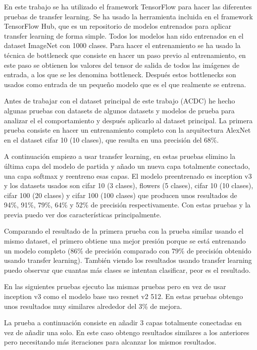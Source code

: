 \documentclass[12pt,a4paper]{article}
\begin{document}
En este trabajo se ha utilizado el framework TensorFlow para hacer las diferentes pruebas de transfer learning. Se ha usado la herramienta incluida en el framework TensorFlow Hub, que es un repositorio de modelos entrenados para aplicar transfer learning de forma simple. Todos los modelos han sido entrenados en el dataset ImageNet con 1000 clases. Para hacer el entrenamiento se ha usado la técnica de bottleneck que consiste en hacer un paso previo al entrenamiento, en este paso se obtienen los valores del tensor de salida de todos las imágenes de entrada, a los que se les denomina bottleneck. Después estos bottlenecks son usados como entrada de un pequeño modelo que es el que realmente se entrena.
\bigskip

Antes de trabajar con el dataset principal de este trabajo (ACDC) he hecho algunas pruebas con datasets de algunos datasets y modelos de prueba para analizar el el comportamiento y después aplicarlo al dataset principal. La primera prueba consiste en hacer un entrenamiento completo con la arquitectura AlexNet en el dataset cifar 10 (10 clases), que resulta en una precisión del 68\%.
\bigskip

A continuación empiezo a usar transfer learning, en estas pruebas elimino la última capa del modelo de partida y añado un nueva capa totalmente conectado, una capa softmax y reentreno esas capas. El modelo preentrenado es inception v3 y los datasets usados son cifar 10 (3 clases), flowers (5 clases), cifar 10 (10 clases), cifar 100 (20 clases) y cifar 100 (100 clases) que producen unos resultados de 94\%, 91\%, 79\%, 64\% y 52\% de precisión respectivamente. Con estas pruebas y la previa puedo ver dos características principalmente.
\bigskip

Comparando el resultado de la primera prueba con la prueba similar usando el mismo dataset, el primero obtiene una mejor presión porque se está entrenando un modelo completo (86\% de precisión comparado con 79\% de precisión obtenido usando transfer learning). También viendo los resultados usando transfer learning puedo observar que cuantas más clases se intentan clasificar, peor es el resultado.
\bigskip

En las siguientes pruebas ejecuto las mismas pruebas pero en vez de usar inception v3 como el modelo base uso resnet v2 512. En estas pruebas obtengo unos resultados muy similares alrededor del 3\% de mejora.
\bigskip

La prueba a continuación consiste en añadir 3 capas totalmente conectadas en vez de añadir una solo. En este caso obtengo resultados similares a los anteriores pero necesitando más iteraciones para alcanzar los mismos resultados.
\bigskip
\end{document}
